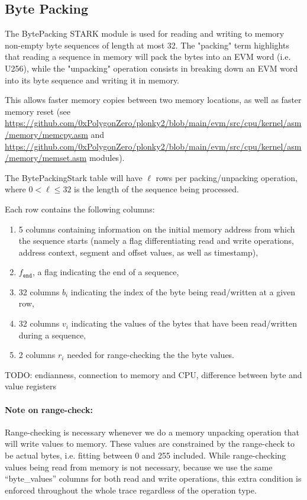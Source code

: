 \subsection{Byte Packing}
\label{byte-packing}

The BytePacking STARK module is used for reading and writing to memory non-empty byte sequences of length at most 32.
The "packing" term highlights that reading a sequence in memory will pack the bytes into an EVM word (i.e. U256), while
the "unpacking" operation consists in breaking down an EVM word into its byte sequence and writing it in memory.

This allows faster memory copies between two memory locations, as well as faster memory reset
(see \href{memcpy.asm}{https://github.com/0xPolygonZero/plonky2/blob/main/evm/src/cpu/kernel/asm/memory/memcpy.asm} and 
\href{memset.asm}{https://github.com/0xPolygonZero/plonky2/blob/main/evm/src/cpu/kernel/asm/memory/memset.asm} modules).

The BytePackingStark table will have $\ell$ rows per packing/unpacking operation, where $0 < \ell \leq 32$ is the length of the sequence being processed.

Each row contains the following columns:
\begin{enumerate}
    \item 5 columns containing information on the initial memory address from which the sequence starts
    (namely a flag differentiating read and write operations, address context, segment and offset values, as well as timestamp),
    \item $f_{\texttt{end}}$, a flag indicating the end of a sequence,
    \item 32 columns $b_i$ indicating the index of the byte being read/written at a given row,
    \item 32 columns $v_i$ indicating the values of the bytes that have been read/written during a sequence,
    \item 2 columns $r_i$ needed for range-checking the the byte values.
\end{enumerate}


TODO: endianness, connection to memory and CPU, difference between byte and value registers



\paragraph*{Note on range-check:} Range-checking is necessary whenever we do a memory unpacking operation that will
write values to memory. These values are constrained by the range-check to be actual bytes, i.e. fitting between 0 and 255 included.
While range-checking values being read from memory is not necessary, because we use the same ``byte_values'' columns for both read
and write operations, this extra condition is enforced throughout the whole trace regardless of the operation type.


